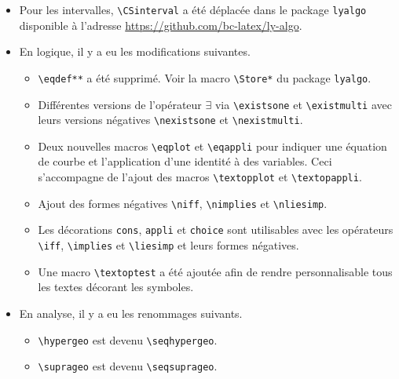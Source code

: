 \documentclass[12pt,a4paper]{article}
\newcommand\env[1]{\texttt{#1}}
\newcommand\macro[1]{\env{\textbackslash{}#1}}
\theoremstyle{definition}
\begin{document}
\begin{description}
    \begin{itemize}[itemsep=.5em]
        \item Pour les intervalles, \macro{CSinterval} a été déplacée dans le package \verb+lyalgo+ disponible à l'adresse \url{https://github.com/bc-latex/ly-algo}.
    
    
        \item En logique, il y a eu les modifications suivantes.
        \begin{itemize}[itemsep=.5em]
            \item \macro{eqdef**} a été supprimé. Voir la macro \macro{Store*} du package \verb+lyalgo+.
    
            \item Différentes versions de l'opérateur $\exists$ via \macro{existsone} et \macro{existmulti} avec leurs versions négatives \macro{nexistsone} et \macro{nexistmulti}.
    
            \item Deux nouvelles macros \macro{eqplot} et \macro{eqappli} pour indiquer une équation de courbe et l'application d'une identité à des variables. Ceci s'accompagne de l'ajout des macros \macro{textopplot} et \macro{textopappli}.
    
            \item Ajout des formes négatives \macro{niff}, \macro{nimplies} et \macro{nliesimp}.
    
            \item Les décorations \verb+cons+, \verb+appli+ et \verb+choice+ sont utilisables avec les opérateurs \macro{iff}, \macro{implies} et \macro{liesimp} et leurs formes négatives.
    
            \item Une macro \macro{textoptest} a été ajoutée afin de rendre personnalisable tous les textes décorant les symboles.
        \end{itemize}
    
    
        \item En analyse, il y a eu les renommages suivants.
        \begin{itemize}[itemsep=.5em]
            \item \macro{hypergeo} est devenu \macro{seqhypergeo}.
    
            \item \macro{suprageo} est devenu \macro{seqsuprageo}.
        \end{itemize}
    

\end{itemize}
\end{description}
\end{document}

